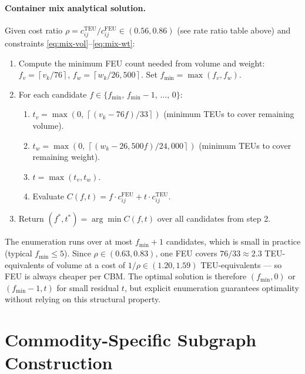 \documentclass[11pt,a4paper]{article}
\newcommand{\ceil}[1]{\left\lceil #1 \right\rceil}
\theoremstyle{definition}
\begin{document}
\paragraph{Container mix analytical solution.}
\label{sec:mix-algo}
Given cost ratio $\rho = c_{ij}^{\text{TEU}} / c_{ij}^{\text{FEU}} \in (0.56, 0.86)$ (see rate ratio table above) and constraints
\eqref{eq:mix-vol}--\eqref{eq:mix-wt}:

\begin{enumerate}[noitemsep]
  \item Compute the minimum FEU count needed from volume and weight:
        $f_v = \ceil{v_k / 76}$, $f_w = \ceil{w_k / 26{,}500}$. Set $f_{\min} = \max(f_v, f_w)$.
  \item For each candidate $f \in \{f_{\min},\, f_{\min}-1,\, \ldots,\, 0\}$:
        \begin{enumerate}[noitemsep, label=\alph*.]
          \item $t_v = \max\!\left(0,\, \ceil{(v_k - 76f)/33}\right)$
                (minimum TEUs to cover remaining volume).
          \item $t_w = \max\!\left(0,\, \ceil{(w_k - 26{,}500f)/24{,}000}\right)$
                (minimum TEUs to cover remaining weight).
          \item $t = \max(t_v, t_w)$.
          \item Evaluate $C(f,t) = f \cdot c_{ij}^{\text{FEU}} + t \cdot c_{ij}^{\text{TEU}}$.
        \end{enumerate}
  \item Return $(f^*, t^*) = \arg\min C(f,t)$ over all candidates from step 2.
\end{enumerate}

The enumeration runs over at most $f_{\min}+1$ candidates, which is small in practice
(typical $f_{\min} \leq 5$). Since $\rho \in (0.63, 0.83)$, one FEU covers
$76/33 \approx 2.3$ TEU-equivalents of volume at a cost of $1/\rho \in (1.20, 1.59)$
TEU-equivalents --- so FEU is always cheaper per CBM. The optimal solution is therefore
$(f_{\min}, 0)$ or $(f_{\min}-1, t)$ for small residual $t$, but explicit enumeration
guarantees optimality without relying on this structural property.

\section{Commodity-Specific Subgraph Construction}
\label{sec:prefilter}
\end{document}
